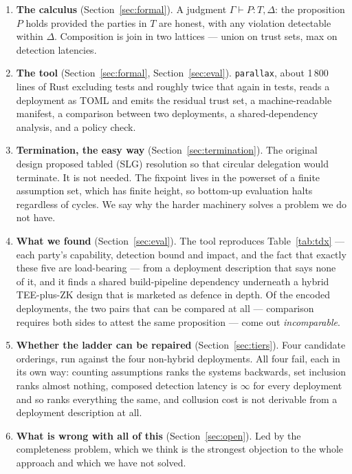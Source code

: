 \documentclass[11pt]{article}
\newcommand{\parallax}{\texttt{parallax}}
\newcommand{\Never}{\infty}
\begin{document}
\begin{enumerate}[itemsep=1pt,topsep=2pt]
\item \textbf{The calculus} (Section~\ref{sec:formal}). A judgment $\Gamma
\vdash P : T, \Delta$: the proposition $P$ holds provided the parties in $T$
are honest, with any violation detectable within $\Delta$. Composition is
join in two lattices --- union on trust sets, max on detection latencies.
\item \textbf{The tool} (Section~\ref{sec:formal}, Section~\ref{sec:eval}).
\parallax{}, about 1\,800 lines of Rust excluding tests and roughly twice
that again in tests, reads a deployment as TOML and
emits the residual trust set, a machine-readable manifest, a comparison
between two deployments, a shared-dependency analysis, and a policy check.
\item \textbf{Termination, the easy way} (Section~\ref{sec:termination}). The
original design proposed tabled (SLG) resolution so that circular delegation
would terminate. It is not needed. The fixpoint lives in the powerset of a
finite assumption set, which has finite height, so bottom-up evaluation halts
regardless of cycles. We say why the harder machinery solves a problem we do
not have.
\item \textbf{What we found} (Section~\ref{sec:eval}). The tool reproduces
Table~\ref{tab:tdx} --- each party's capability, detection bound and impact,
and the fact that exactly these five are load-bearing --- from a deployment
description that says none of it, and it finds a shared build-pipeline
dependency underneath a hybrid TEE-plus-ZK design that is marketed as defence
in depth. Of the encoded deployments, the two pairs that can be compared at
all --- comparison requires both sides to attest the same proposition ---
come out \emph{incomparable}.
\item \textbf{Whether the ladder can be repaired} (Section~\ref{sec:tiers}).
Four candidate orderings, run against the four non-hybrid
deployments. All four fail,
each in its own way: counting assumptions ranks the systems backwards, set
inclusion ranks almost nothing, composed detection latency is $\Never$ for
every deployment and so ranks everything the same, and collusion cost is not
derivable from a deployment description at all.
\item \textbf{What is wrong with all of this} (Section~\ref{sec:open}). Led by
the completeness problem, which we think is the strongest objection to the
whole approach and which we have not solved.
\end{enumerate}
\end{document}
